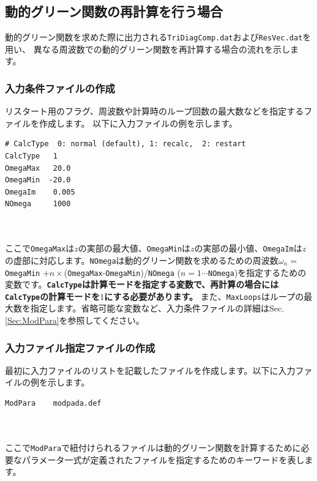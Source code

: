 \documentclass[12pt,titlepage]{jarticle}
\begin{document}
\subsection{動的グリーン関数の再計算を行う場合}
動的グリーン関数を求めた際に出力される\verb|TriDiagComp.dat|および\verb|ResVec.dat|を用い、
異なる周波数での動的グリーン関数を再計算する場合の流れを示します。
\subsubsection*{入力条件ファイルの作成}
リスタート用のフラグ、周波数や計算時のループ回数の最大数などを指定するファイルを作成します。
以下に入力ファイルの例を示します。\\
\begin{minipage}{12.5cm}
\begin{screen}
\begin{verbatim}
# CalcType  0: normal (default), 1: recalc,  2: restart
CalcType   1          
OmegaMax   20.0
OmegaMin  -20.0
OmegaIm    0.005
NOmega     1000  
\end{verbatim}
\end{screen}
\end{minipage}
\\ \\
ここで\verb|OmegaMax|は$z$の実部の最大値、\verb|OmegaMin|は$z$の実部の最小値、\verb|OmegaIm|は$z$の虚部に対応します。\verb|NOmega|は動的グリーン関数を求めるための周波数$\omega_n = $ \verb|OmegaMin| $+n\times$(\verb|OmegaMax|-\verb|OmegaMin|)/\verb|NOmega| ($n=1\cdots$\verb|NOmega|)を指定するための変数です。{\bf \verb|CalcType|は計算モードを指定する変数で、再計算の場合には\verb|CalcType|の計算モードを$1$にする必要があります。}
また、\verb|MaxLoops|はループの最大数を指定します。省略可能な変数など、入力条件ファイルの詳細はSec. \ref{Sec:ModPara}を参照してください。

\subsubsection*{入力ファイル指定ファイルの作成}
最初に入力ファイルのリストを記載したファイルを作成します。以下に入力ファイルの例を示します。\\
\begin{minipage}{10cm}
\begin{screen}
\begin{verbatim}
ModPara    modpada.def
\end{verbatim}
\end{screen}
\end{minipage}
\\\\
ここで\verb|ModPara|で紐付けられるファイルは動的グリーン関数を計算するために必要なパラメータ一式が定義されたファイルを指定するためのキーワードを表します。
\end{document}
